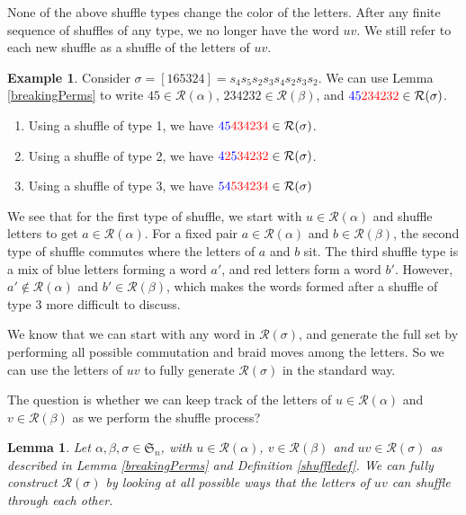 \documentclass[11pt,reqno]{amsart}
\newtheorem{lemma}[theorem]{Lemma}
\theoremstyle{definition}
\newtheorem{example}[theorem]{Example}
\theoremstyle{notation}
\newcommand{\calR}{\mathcal{R}}
\begin{document}
None of the above shuffle types change the color of the letters. After any finite sequence of shuffles of any type, we no longer have the word $uv$. We still refer to each new shuffle as a shuffle of the letters of $uv$. 

\begin{example}
Consider $\sigma = [165324]=s_4s_5 s_2s_3s_4s_2 s_3 s_2$. We can use Lemma \ref{breakingPerms} to write $45\in \calR(\alpha)$, $234232\in \calR(\beta)$, and ${\color{blue}45}{\color{red}234232}\in \calR(\sigma)$.
\begin{enumerate}
    \item Using a shuffle of type 1, we have ${\color{blue}45}{\color{red}434234}\in \calR(\sigma)$.
    \item Using a shuffle of type 2, we have ${\color{blue}4}{\color{red}2}{\color{blue}5}{\color{red}34232}\in \calR(\sigma)$.
    \item Using a shuffle of type 3, we have ${\color{blue}54}{\color{red}534234}\in \calR(\sigma)$
\end{enumerate}
\end{example}


We see that for the first type of shuffle, we start with $u\in \calR(\alpha)$ and shuffle letters to get $a\in \calR(\alpha)$. For a fixed pair $a\in \calR(\alpha)$ and $b\in \calR(\beta)$, the second type of shuffle commutes where the letters of $a$ and $b$ sit. The third shuffle type is a mix of blue letters forming a word $a'$, and red letters form a word $b'$. However, $a'\notin \calR(\alpha)$ and $b'\in \calR(\beta)$, which makes the words formed after a shuffle of type 3 more difficult to discuss.

We know that we can start with any word in $\calR(\sigma)$, and generate the full set by performing all possible commutation and braid moves among the letters. So we can use the letters of $uv$ to fully generate $\calR(\sigma)$ in the standard way. 

The question is whether we can keep track of the letters of $u\in \calR(\alpha)$ and $v\in \calR(\beta)$ as we perform the shuffle process?

\begin{lemma}\label{permsSuffle}
Let $\alpha, \beta, \sigma\in \mathfrak{S}_n$, with $u\in \calR(\alpha)$, $v\in \calR(\beta)$ and $uv\in \calR(\sigma)$ as described in Lemma \ref{breakingPerms} and Definition \ref{shuffledef}. We can fully construct $\calR(\sigma)$ by looking at all possible ways that the letters of $uv$ can shuffle through each other. 
\end{lemma}
\end{document}
